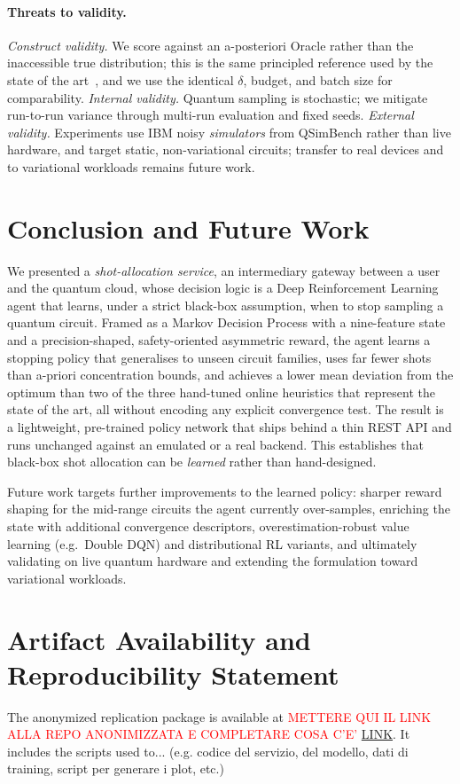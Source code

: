 \documentclass[runningheads]{llncs}
\begin{document}
\paragraph{Threats to validity.} \emph{Construct validity.} We score against an a-posteriori Oracle rather than the
inaccessible true distribution; this is the same principled reference used by the
state of the art~\cite{bisicchia2026shots}, and we use the identical $\delta$,
budget, and batch size for comparability. \emph{Internal validity.} Quantum
sampling is stochastic; we mitigate run-to-run variance through multi-run
evaluation and fixed seeds. \emph{External validity.} Experiments use IBM noisy
\emph{simulators} from QSimBench rather than live hardware, and target static,
non-variational circuits; transfer to real devices and to variational workloads
remains future work.

\section{Conclusion and Future Work}
\label{sec:conclusion}

We presented a \emph{shot-allocation service}, an intermediary gateway between a
user and the quantum cloud, whose decision logic is a Deep Reinforcement Learning
agent that learns, under a strict black-box assumption, when to stop sampling a
quantum circuit. Framed as a Markov Decision Process with a nine-feature state and
a precision-shaped, safety-oriented asymmetric reward, the agent learns a stopping
policy that generalises to unseen circuit families, uses far fewer shots than
a-priori concentration bounds, and achieves a lower mean deviation from the
optimum than two of the three hand-tuned online heuristics that represent the
state of the art, all without encoding any explicit convergence test.
The result is a lightweight, pre-trained policy network that ships behind a thin
REST API and runs unchanged against an emulated or a real backend. This
establishes that black-box shot allocation can be \emph{learned} rather than
hand-designed.

Future work targets further improvements to the learned policy: sharper
reward shaping for the mid-range circuits the agent currently over-samples,
enriching the state with additional convergence descriptors, overestimation-robust
value learning (e.g.\ Double DQN) and distributional RL variants, and ultimately
validating on live quantum hardware and extending the formulation toward
variational workloads.

\section*{Artifact Availability and Reproducibility Statement}

The anonymized replication package is available at
\textcolor{red}{METTERE QUI IL LINK ALLA REPO ANONIMIZZATA E COMPLETARE COSA C'E'}
\url{LINK}. It includes the scripts used to... (e.g. codice del servizio, del modello, dati di training, script per generare i plot, etc.)



\end{document}
